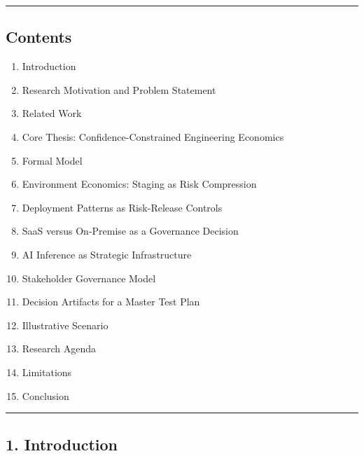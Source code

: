\documentclass[
]{article}
\providecommand{\tightlist}{%
  \setlength{\itemsep}{0pt}\setlength{\parskip}{0pt}}
\begin{document}
\begin{center}\rule{0.5\linewidth}{0.5pt}\end{center}

\subsection{Contents}\label{contents}

\begin{enumerate}
\def\labelenumi{\arabic{enumi}.}
\tightlist
\item
  Introduction\\
\item
  Research Motivation and Problem Statement\\
\item
  Related Work\\
\item
  Core Thesis: Confidence-Constrained Engineering Economics\\
\item
  Formal Model\\
\item
  Environment Economics: Staging as Risk Compression\\
\item
  Deployment Patterns as Risk-Release Controls\\
\item
  SaaS versus On-Premise as a Governance Decision\\
\item
  AI Inference as Strategic Infrastructure\\
\item
  Stakeholder Governance Model\\
\item
  Decision Artifacts for a Master Test Plan\\
\item
  Illustrative Scenario\\
\item
  Research Agenda\\
\item
  Limitations\\
\item
  Conclusion
\end{enumerate}

\begin{center}\rule{0.5\linewidth}{0.5pt}\end{center}

\subsection{1. Introduction}\label{introduction}
\end{document}
